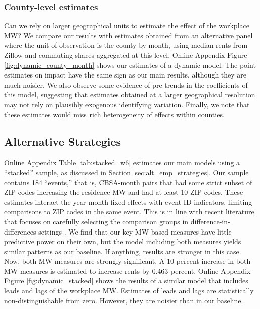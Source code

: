 \subsubsection{County-level estimates}

Can we rely on larger geographical units to estimate the effect of the 
workplace MW?
We compare our results with estimates obtained from an alternative panel 
where the unit of observation is the county by month, using median rents 
from Zillow and commuting shares aggregated at this level.
Online Appendix Figure \ref{fig:dynamic_county_month} shows our estimates 
of a dynamic model.
The point estimates on impact have the same sign as our main results,
although they are much noisier.
We also observe some evidence of pre-trends in the coefficients of this 
model, suggesting that estimates obtained at a larger geographical 
resolution may not rely on plausibly exogenous identifying variation.
Finally, we note that these estimates would miss rich heterogeneity of 
effects within counties.

\subsection{Alternative Strategies}
\label{sec:results_alternative_strategies}

Online Appendix Table \ref{tab:stacked_w6} estimates our main models using a 
``stacked'' sample, as discussed in Section \ref{sec:alt_emp_strategies}.
Our sample contains 184 ``events,'' that is, CBSA-month pairs that had some 
strict subset of ZIP codes increasing the residence MW and had at least 10
ZIP codes.
These estimates interact the year-month fixed effects with event ID indicators, 
limiting comparisons to ZIP codes in the same event.
This is in line with recent literature that focuses on carefully selecting the 
comparison groups in difference-in-differences settings
\parencite{deChaisemartinEtAl2022, RothEtAl2022}.
We find that our key MW-based measures have little predictive power on their own,
but the model including both measures yields similar patterns as our baseline.
If anything, results are stronger in this case.
Now, both MW measures are strongly significant.
A 10 percent increase in both MW measures is estimated to increase rents 
by $\textnormal{0.463}$ percent.
Online Appendix Figure \ref{fig:dynamic_stacked} shows the results of a similar 
model that includes leads and lags of the workplace MW.
Estimates of leads and lags are statistically non-distinguishable from zero.
However, they are noisier than in our baseline.

